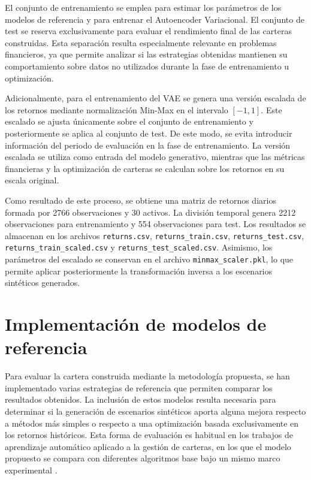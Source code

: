 El conjunto de entrenamiento se emplea para estimar los parámetros de los modelos de referencia y para entrenar el Autoencoder Variacional. El conjunto de test se reserva exclusivamente para evaluar el rendimiento final de las carteras construidas. Esta separación resulta especialmente relevante en problemas financieros, ya que permite analizar si las estrategias obtenidas mantienen su comportamiento sobre datos no utilizados durante la fase de entrenamiento u optimización.

Adicionalmente, para el entrenamiento del VAE se genera una versión escalada de los retornos mediante normalización Min-Max en el intervalo \([-1,1]\). Este escalado se ajusta únicamente sobre el conjunto de entrenamiento y posteriormente se aplica al conjunto de test. De este modo, se evita introducir información del periodo de evaluación en la fase de entrenamiento. La versión escalada se utiliza como entrada del modelo generativo, mientras que las métricas financieras y la optimización de carteras se calculan sobre los retornos en su escala original.

Como resultado de este proceso, se obtiene una matriz de retornos diarios formada por 2766 observaciones y 30 activos. La división temporal genera 2212 observaciones para entrenamiento y 554 observaciones para test. Los resultados se almacenan en los archivos \texttt{returns.csv}, \texttt{returns\_train.csv}, \texttt{returns\_test.csv}, \texttt{returns\_train\_scaled.csv} y \texttt{returns\_test\_scaled.csv}. Asimismo, los parámetros del escalado se conservan en el archivo \texttt{minmax\_scaler.pkl}, lo que permite aplicar posteriormente la transformación inversa a los escenarios sintéticos generados.

\section{Implementación de modelos de referencia}

Para evaluar la cartera construida mediante la metodología propuesta, se han implementado varias estrategias de referencia que permiten comparar los resultados obtenidos. La inclusión de estos modelos resulta necesaria para determinar si la generación de escenarios sintéticos aporta alguna mejora respecto a métodos más simples o respecto a una optimización basada exclusivamente en los retornos históricos. Esta forma de evaluación es habitual en los trabajos de aprendizaje automático aplicado a la gestión de carteras, en los que el modelo propuesto se compara con diferentes algoritmos base bajo un mismo marco experimental \cite{zhang2020deep}.


